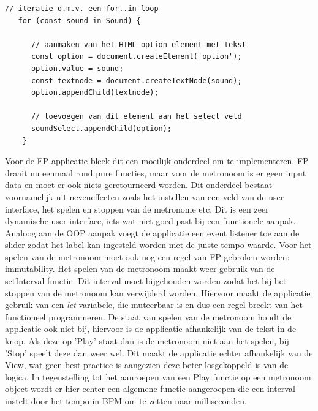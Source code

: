  \begin{lstlisting}[caption=Opvullen van het select veld - OOP]
   // iteratie d.m.v. een for..in loop
   for (const sound in Sound) {

      // aanmaken van het HTML option element met tekst
      const option = document.createElement('option');
      option.value = sound;
      const textnode = document.createTextNode(sound);
      option.appendChild(textnode);

      // toevoegen van dit element aan het select veld
      soundSelect.appendChild(option);
    }
 \end{lstlisting}

 Voor de FP applicatie bleek dit een moeilijk onderdeel om te implementeren. FP draait nu eenmaal rond pure functies, maar voor de metronoom is er geen input data en moet er ook niets geretourneerd worden. Dit onderdeel bestaat voornamelijk uit neveneffecten zoals het instellen van een veld van de user interface, het spelen en stoppen van de metronome etc. Dit is een zeer dynamische user interface, iets wat niet goed past bij een functionele aanpak. Analoog aan de OOP aanpak voegt de applicatie een event listener toe aan de slider zodat het label kan ingesteld worden met de juiste tempo waarde. Voor het spelen van de metronoom moet ook nog een regel van FP gebroken worden: immutability. Het spelen van de metronoom maakt weer gebruik van de setInterval functie. Dit interval moet bijgehouden worden zodat het bij het stoppen van de metronoom kan verwijderd worden. Hiervoor maakt de applicatie gebruik van een \textit{let} variabele, die muteerbaar is en dus een regel breekt van het functioneel programmeren. De staat van spelen van de metronoom houdt de applicatie ook niet bij, hiervoor is de applicatie afhankelijk van de tekst in de knop. Als deze op 'Play' staat dan is de metronoom niet aan het spelen, bij 'Stop' speelt deze dan weer wel. Dit maakt de applicatie echter afhankelijk van de View, wat geen best practice is aangezien deze beter losgekoppeld is van de logica. In tegenstelling tot het aanroepen van een Play functie op een metronoom object wordt er hier echter een algemene functie aangeroepen die een interval instelt door het tempo in BPM om te zetten naar milliseconden.
 

